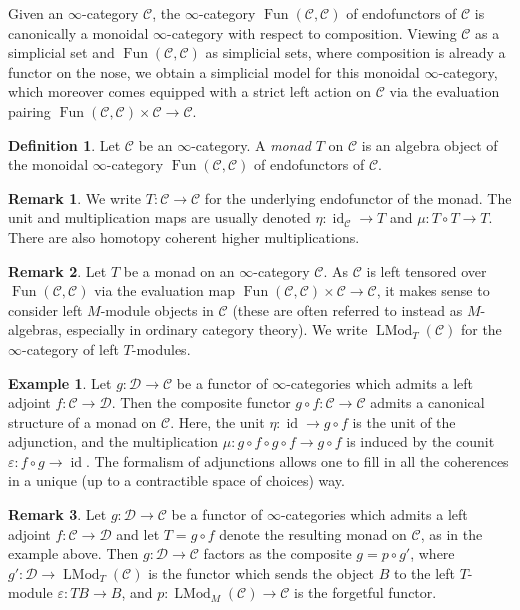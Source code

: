 \documentclass[12pt]{article}
\theoremstyle{definition}
\newtheorem{definition}{Definition}[subsection]
\newtheorem{example}{Example}[subsection]
\newtheorem{remark}{Remark}[subsection]
\newcommand{\C}{\mathcal{C}}
\newcommand{\D}{\mathcal{D}}
\renewcommand{\i}{\infty}
\DeclareMathOperator{\LMod}{LMod}
\DeclareMathOperator{\Fun}{Fun}
\DeclareMathOperator{\id}{id}
\renewcommand{\epsilon}{\varepsilon}
\begin{document}
Given an $\infty$-category $\C$, the $\infty$-category $\Fun(\C,\C)$ of endofunctors of $\C$ is canonically a monoidal $\infty$-category with respect to composition.
Viewing $\C$ as a simplicial set and $\Fun(\C,\C)$ as simplicial sets, where composition is already a functor on the nose, we obtain a simplicial model for this monoidal $\infty$-category, which moreover comes equipped with a strict left action on $\C$ via the evaluation pairing $\Fun(\C,\C)\times\C\to\C$.
\begin{definition}
Let $\C$ be an $\infty$-category.
A {\em monad} $T$ on $\C$ is an algebra object of the monoidal $\i$-category $\Fun(\C,\C)$ of endofunctors of $\C$.
\end{definition}
\begin{remark}
We write $T:\C\to\C$ for the underlying endofunctor of the monad.
The unit and multiplication maps are usually denoted $\eta:\id_\C\to T$ and $\mu:T\circ T\to T$. There are also homotopy coherent higher multiplications.
\end{remark}
\begin{remark}
Let $T$ be a monad on an $\infty$-category $\C$.
As $\C$ is left tensored over $\Fun(\C,\C)$ via the evaluation map $\Fun(\C,\C)\times\C\to\C$, it makes sense to consider left $M$-module objects in $\C$ (these are often referred to instead as $M$-algebras, especially in ordinary category theory).
We write $\LMod_T(\C)$ for the $\infty$-category of left $T$-modules.
\end{remark}

\begin{example}
Let $g:\D\to\C$ be a functor of $\infty$-categories which admits a left adjoint $f:\C\to\D$. Then the composite functor $g\circ f:\C\to\C$ admits a canonical structure of a monad on $\C$.
Here, the unit $\eta:\id\to g\circ f$ is the unit of the adjunction, and the multiplication $\mu:g\circ f\circ g\circ f\to g\circ f$ is induced by the counit $\epsilon:f\circ g\to\id$.
The formalism of adjunctions allows one to fill in all the coherences in a unique (up to a contractible space of choices) way.
\end{example}

\begin{remark}
Let $g:\D\to\C$ be a functor of $\infty$-categories which admits a left adjoint $f:\C\to\D$ and let $T=g\circ f$ denote the resulting monad on $\C$, as in the example above.
Then $g:\D\to\C$ factors as the composite $g=p\circ g'$, where $g':\D\to\LMod_{T}(\C)$ is the functor which sends the object $B$ to the left $T$-module $\epsilon:TB\to B$,
and $p:\LMod_{M}(\C)\to\C$ is the forgetful functor.
\end{remark}
\end{document}
